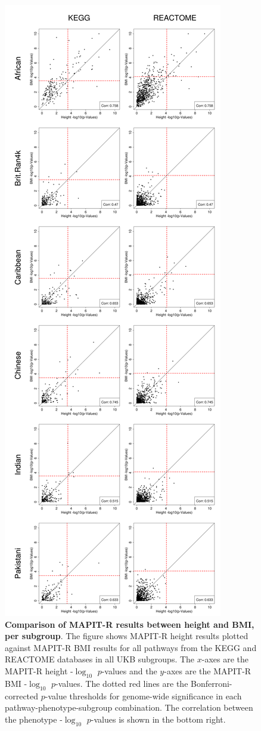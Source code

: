 \setlength{\footskip}{3cm}
\begin{figure}[htbp]
\centering
\vspace*{-2cm}
\includegraphics[scale=.2]{Images/Supp/InterPath_Supp_Figure_MAPITR_PhenoComps_AllPops_vs4.png}
\caption[TBD]{\textbf{Comparison of MAPIT-R results between height and BMI, per subgroup}. The figure shows MAPIT-R height results plotted against MAPIT-R BMI results for all pathways from the KEGG and REACTOME databases in all UKB subgroups. The $x$-axes are the MAPIT-R height -$\log_{10}$ $p$-values and the $y$-axes are the MAPIT-R BMI -$\log_{10}$ $p$-values. The dotted red lines are the Bonferroni-corrected $p$-value thresholds for genome-wide significance in each pathway-phenotype-subgroup combination. The correlation between the phenotype -$\log_{10}$ $p$-values is shown in the bottom right.}
\label{InterPath-Supp-Figure-MAPITR-PhenoComps-AllPops}
\end{figure}
